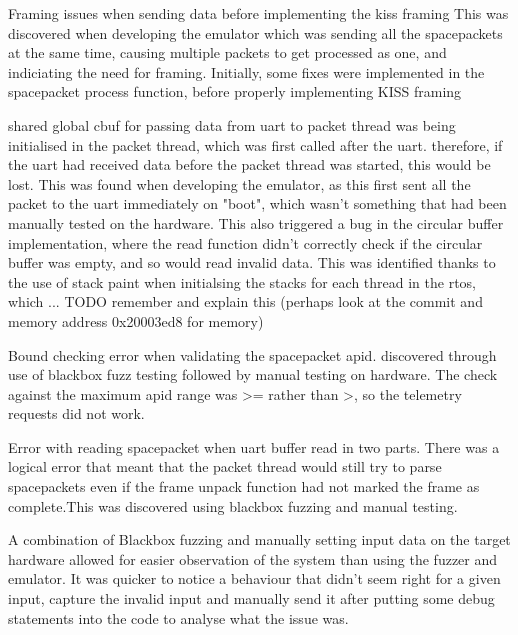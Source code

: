 \documentclass[../report.tex]{subfiles}
\begin{document}
Framing issues when sending data before implementing the kiss framing This was
discovered when developing the emulator which was sending all the spacepackets
at the same time, causing multiple packets to get processed as one, and
indiciating the need for framing. Initially, some fixes were implemented in the
spacepacket process function, before properly implementing KISS framing


shared global cbuf for passing data from uart to packet thread was being
initialised in the packet thread, which was first called after the uart.
therefore, if the uart had received data before the packet thread was started,
this would be lost. This was found when developing the emulator, as this first
sent all the packet to the uart immediately on "boot", which wasn't something
that had been manually tested on the hardware. This also triggered a bug in the
circular buffer implementation, where the read function didn't correctly check
if the circular buffer was empty, and so would read invalid data. This was
identified thanks to the use of stack paint when initialsing the stacks for
each thread in the rtos, which ... TODO remember and explain this (perhaps look
at the commit and memory address 0x20003ed8 for memory)


Bound checking error when validating the spacepacket apid. discovered through
use of blackbox fuzz testing followed by manual testing on hardware. The check
against the maximum apid range was >= rather than >, so the telemetry requests
did not work.

Error with reading spacepacket when uart buffer read in two parts. There was a
logical error that meant that the packet thread would still try to parse
spacepackets even if the frame unpack function had not marked the frame as
complete.This was discovered using blackbox fuzzing and manual testing.





A combination of Blackbox fuzzing and manually setting input data on the target
hardware allowed for easier observation of the system than using the fuzzer and
emulator. It was quicker to notice a behaviour that didn't seem right for a
given input, capture the invalid input and manually send it after putting some
debug statements into the code to analyse what the issue was.
\end{document}
